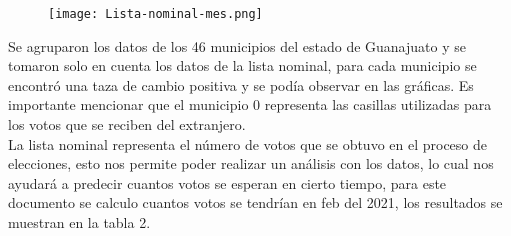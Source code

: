 \documentclass{article}
\begin{document}
 \begin{figure}[!] 
  \texttt{[image: Lista-nominal-mes.png]}
  \centering
  \caption{}
  \label{fig:Lista-mes.jpg.}
\end{figure}

Se agruparon los datos de los 46 municipios del estado de Guanajuato y se tomaron solo en cuenta los datos de la lista nominal, para cada municipio se encontró una taza de cambio positiva y se podía observar en las gráficas. Es importante mencionar que el municipio 0 representa las casillas utilizadas para los votos que se reciben del extranjero.\\

La lista nominal representa el número de votos que se obtuvo en el proceso de elecciones, esto nos permite poder realizar un análisis con los datos, lo cual nos ayudará a predecir cuantos votos se esperan en cierto tiempo, para este documento se calculo cuantos votos se tendrían en feb del 2021, los resultados se muestran en la tabla 2.
\end{document}
